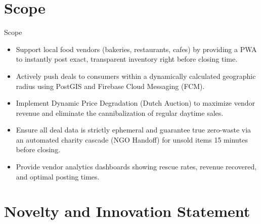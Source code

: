 \documentclass[aspectratio=169,xcolor=dvipsnames]{beamer}
\begin{document}
\section{Scope}
\begin{frame}{Scope}
\justifying

\begin{itemize}
    \item Support local food vendors (bakeries, restaurants, cafes) by providing a PWA to instantly post exact, transparent inventory right before closing time.

    \item Actively push deals to consumers within a dynamically calculated geographic radius using PostGIS and Firebase Cloud Messaging (FCM).

    \item Implement Dynamic Price Degradation (Dutch Auction) to maximize vendor revenue and eliminate the cannibalization of regular daytime sales.

    \item Ensure all deal data is strictly ephemeral and guarantee true zero-waste via an automated charity cascade (NGO Handoff) for unsold items 15 minutes before closing.

    \item Provide vendor analytics dashboards showing rescue rates, revenue recovered, and optimal posting times.
\end{itemize}

\end{frame}
\section{Novelty and Innovation Statement}
\end{document}
